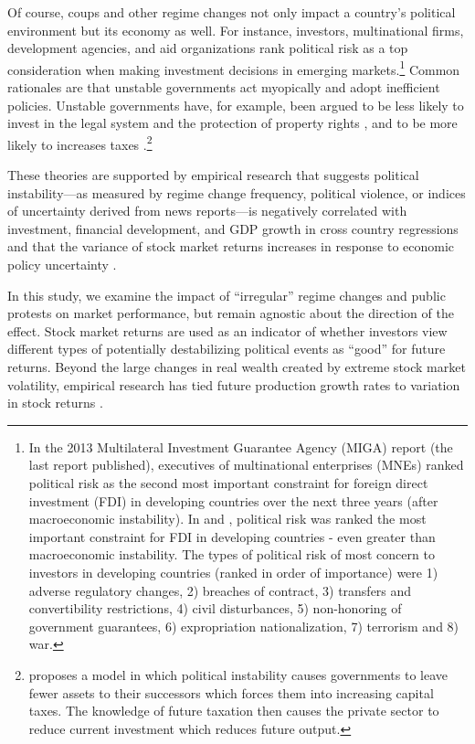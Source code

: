 \documentclass[12pt,final,fleqn]{article}
\theoremstyle{plain}
\begin{document}
Of course, coups and other regime changes not only impact a country's political environment but its economy as well. For instance, investors, multinational firms, development agencies, and aid organizations rank political risk as a top consideration when making investment decisions in emerging markets.\footnote{In the 2013 Multilateral Investment Guarantee Agency (MIGA) \citet{wipr2013} report (the last report published), executives of multinational enterprises (MNEs) ranked political risk as the second most important constraint for foreign direct investment (FDI) in developing countries over the next three years (after macroeconomic instability). In \citet{wipr2011} and  \citet{wipr2012}, political risk was ranked the most important constraint for FDI in developing countries - even greater than macroeconomic instability. The types of political risk of most concern to investors in developing countries (ranked in order of importance) were 1) adverse regulatory changes, 2) breaches of contract, 3) transfers and convertibility restrictions, 4) civil disturbances, 5) non-honoring of government guarantees, 6) expropriation nationalization, 7) terrorism and 8) war.} Common rationales are that unstable governments act myopically and adopt inefficient policies. Unstable governments have, for example, been argued to be less likely to invest in the legal system and the protection of property rights \citep{svensson1998investment}, and to be more likely to increases taxes \citep{devereux1998political}.\footnote{\citet{devereux1998political} proposes a model in which political instability causes governments to leave fewer assets to their successors which forces them into increasing capital taxes. The knowledge of future taxation then causes the private sector to reduce current investment which reduces future output.} 

These theories are supported by empirical research that suggests political instability---as measured by regime change frequency, political violence, or indices of uncertainty derived from news reports---is negatively correlated with investment, financial development, and GDP growth in cross country regressions \citep{aisen2013does, alesina1996income, alesina1996political, fosu1992political, jong2009measurement, roe2011political, baker2016measuring} and that the variance of stock market returns increases in response to economic policy uncertainty \citep{leblang2005government, jensen2005market, liu2015economic}.

In this study, we examine the impact of ``irregular'' regime changes and public protests on market performance, but remain agnostic about the direction of the effect. Stock market returns are used as an indicator of whether investors view different types of potentially destabilizing political events as ``good'' for future returns. Beyond the large changes in real wealth created by extreme stock market volatility, empirical research has tied future production growth rates to variation in stock returns \citep{schwert1990stock, fama1990stock}.
\end{document}
